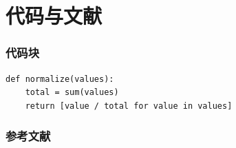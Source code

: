 \section{代码与文献}

\begin{frame}[fragile]
  \frametitle{代码块}
  \begin{lstlisting}[style=python]
def normalize(values):
    total = sum(values)
    return [value / total for value in values]
  \end{lstlisting}
\end{frame}

\begin{frame}[allowframebreaks]
  \frametitle{参考文献}
  \printbibliography
\end{frame}
